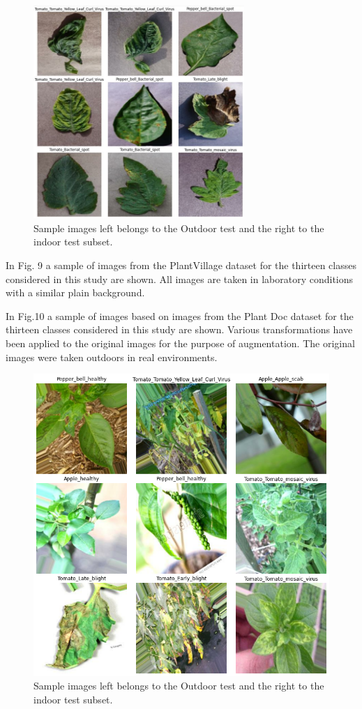 \documentclass[conference]{IEEEtran}
\begin{document}
\begin{figure}[htbp]
\centerline{\includegraphics[width=8cm]{indoor_images.png}}
\caption{Sample images left belongs to the Outdoor test and the right to the indoor test subset.}
\label{fig}
\end{figure}
In Fig. 9 a sample of images from the PlantVillage dataset for the thirteen classes considered in this study are shown. All images are taken in laboratory conditions with a similar plain background. \

In Fig.10 a sample of images based on images from the Plant Doc dataset for the thirteen classes considered in this study are shown. Various transformations have been applied to the original images for the purpose of augmentation. The original images were taken outdoors in real environments. 
\begin{figure}[htbp]
\centerline{\includegraphics[width=8.cm]{outdoor_images.png}}
\caption{Sample images left belongs to the Outdoor test and the right to the indoor test subset.}
\label{fig}
\end{figure}
\end{document}
